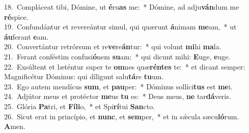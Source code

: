 {18.~}Compláceat tibi, Dómine, ut \textbf{é}ru\textbf{as} me:~* Dómine, ad adju\textbf{ván}dum me \textbf{ré}spice.\\
{19.~}Confundántur et revereántur simul, qui quærunt \textbf{á}nimam \textbf{me}am,~* ut \textbf{áu}ferant \textbf{e}am.\\
{20.~}Convertántur retrórsum et re\textbf{ve}re\textbf{án}tur:~* qui volunt \textbf{mi}hi \textbf{ma}la.\\
{21.~}Ferant conféstim confusi\textbf{ó}nem \textbf{su}am:~* qui dicunt mihi: \textbf{E}uge, \textbf{e}uge.\\
{22.~}Exsúltent et læténtur super te \textbf{om}nes quæ\textbf{rén}\textbf{tes} te:~* et dicant semper: Magnificétur Dóminus: qui díligunt salu\textbf{tá}re \textbf{tu}um.\\
{23.~}Ego autem mendícus \textbf{sum}, et \textbf{pau}per:~* Dóminus sollíci\textbf{tus} est \textbf{me}i.\\
{24.~}Adjútor meus et protéctor \textbf{me}us \textbf{tu} es:~* Deus meus, \textbf{ne} tar\textbf{dá}veris.\\
{25.~}Glória \textbf{Pa}tri, et \textbf{Fí}\textbf{li}o,~* et Spi\textbf{rí}tui \textbf{San}cto.\\
{26.~}Sicut erat in princípio, et \textbf{nunc}, et \textbf{sem}per,~* et in sǽcula sæcu\textbf{ló}rum. \textbf{A}men.\\
